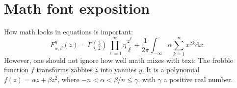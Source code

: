 \documentclass{uai2026} %
\begin{document}
\section{Math font exposition}
\providecommand{\upGamma}{\Gamma}
\providecommand{\uppi}{\pi}
How math looks in equations is important:
\begin{equation*}
  F_{\alpha,\beta}^\eta(z) = \upGamma(\tfrac{3}{2}) \prod_{\ell=1}^\infty\eta \frac{z^\ell}{\ell} + \frac{1}{2\uppi}\int_{-\infty}^z\alpha \sum_{k=1}^\infty x^{\beta k}\mathrm{d}x.
\end{equation*}
However, one should not ignore how well math mixes with text:
The frobble function \(f\) transforms zabbies \(z\) into yannies \(y\).
It is a polynomial \(f(z)=\alpha z + \beta z^2\), where \(-n<\alpha<\beta/n\leq\gamma\), with \(\gamma\) a positive real number.
\end{document}
